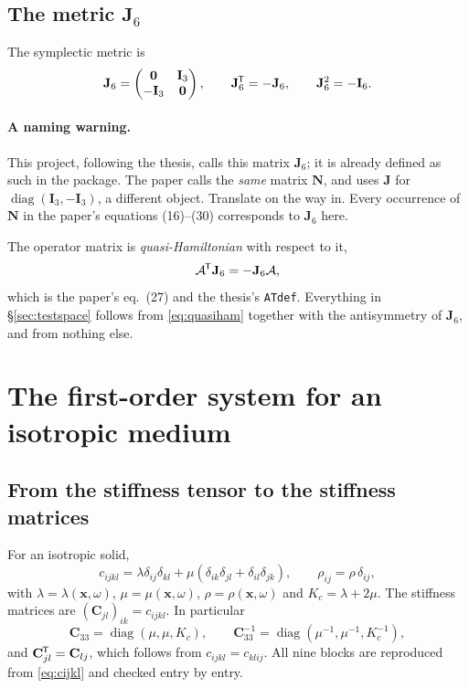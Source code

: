 \documentclass[11pt,a4paper]{article}
\newcommand{\bI}{\mathbf{I}}
\newcommand{\bC}{\mathbf{C}}
\newcommand{\Aop}{\mathcal{A}}
\newcommand{\Jsix}{\mathbf{J}_{6}}
\newcommand{\tp}{^{\mkern-1.5mu\mathsf{T}}}
\begin{document}
\subsection{The metric \texorpdfstring{$\Jsix$}{J6}}\label{sec:metric}

The symplectic metric is
\begin{equation}\label{eq:J6}
  \Jsix = \begin{pmatrix}\mathbf{0} & \bI_3\\ -\bI_3 & \mathbf{0}\end{pmatrix},
  \qquad \Jsix\tp = -\Jsix,
  \qquad \Jsix^{2} = -\bI_6 .
\end{equation}

\paragraph{A naming warning.}  This project, following the thesis, calls this
matrix $\Jsix$; it is already defined as such in the package.  The paper calls
the \emph{same} matrix $\mathbf{N}$, and uses $\mathbf{J}$ for
$\operatorname{diag}(\bI_3,-\bI_3)$, a different object.  Translate on the way
in.  Every occurrence of $\mathbf{N}$ in the paper's equations (16)--(30)
corresponds to $\Jsix$ here.

The operator matrix is \emph{quasi-Hamiltonian} with respect to it,
\begin{equation}\label{eq:quasiham}
  \Aop\tp\Jsix = -\Jsix\Aop,
\end{equation}
which is the paper's eq.~(27) and the thesis's \texttt{ATdef}.  Everything in
\S\ref{sec:testspace} follows from \eqref{eq:quasiham} together with the
antisymmetry of $\Jsix$, and from nothing else.

\section{The first-order system for an isotropic medium}

\subsection{From the stiffness tensor to the stiffness matrices}

For an isotropic solid,
\begin{equation}\label{eq:cijkl}
  c_{ijkl} = \lambda\delta_{ij}\delta_{kl}
           + \mu(\delta_{ik}\delta_{jl} + \delta_{il}\delta_{jk}),
  \qquad \rho_{ij} = \rho\,\delta_{ij},
\end{equation}
with $\lambda = \lambda(\mathbf{x},\omega)$, $\mu = \mu(\mathbf{x},\omega)$,
$\rho = \rho(\mathbf{x},\omega)$ and $K_c = \lambda + 2\mu$.  The stiffness
matrices are $(\bC_{jl})_{ik} = c_{ijkl}$.  In particular
\begin{equation}
  \bC_{33} = \operatorname{diag}(\mu,\mu,K_c),
  \qquad
  \bC_{33}^{-1} = \operatorname{diag}(\mu^{-1},\mu^{-1},K_c^{-1}),
\end{equation}
and $\bC_{jl}\tp = \bC_{lj}$, which follows from $c_{ijkl} = c_{klij}$.  All
nine blocks are reproduced from \eqref{eq:cijkl} and checked entry by entry.
\end{document}

